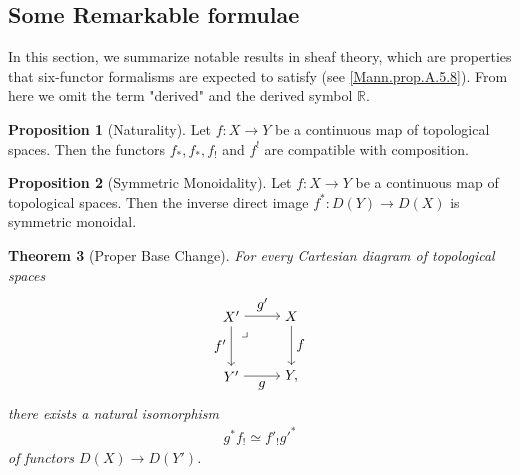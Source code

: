 \documentclass[a4paper,dvipdfmx,11pt,reqno]{amsart}
\newcommand{\bbR}{\mathbb{R}}
\newtheorem{theorem}{Theorem}[section]
\theoremstyle{definition}
\newtheorem{proposition}[theorem]{Proposition}
\begin{document}
\subsection{Some Remarkable formulae} \label{subsec.remarkable_results}

In this section, we summarize notable results in sheaf theory, which are properties that six-functor formalisms are expected to satisfy (see \cref{Mann.prop.A.5.8}).
From here we omit the term "derived" and the derived symbol $\bbR$.

\begin{proposition}[Naturality] \label{thrm.naturality}
  Let $f : X \to Y$ be a continuous map of topological spaces.
  Then the functors $f_{*}, f_{*}, f_{!}$ and $f^{!}$ are compatible with composition.
\end{proposition}

\begin{proposition}[Symmetric Monoidality] \label{thrm.symmetric_monoidality}
  Let $f : X \to Y$ be a continuous map of topological spaces.
  Then the inverse direct image $f^{*} : D(Y) \to D(X)$ is symmetric monoidal.
\end{proposition}

\begin{theorem}[Proper Base Change] \label{thrm.proper_base_change}
  For every Cartesian diagram of topological spaces
  \[\begin{tikzpicture}[auto,->] 
    \node (tl) at (0,1.5) {$X'$}; 
    \node (tr) at (1.5,1.5) {$X$};
    \node (bl) at (0,0) {$Y'$}; 
    \node (br) at (1.5,0) {$Y,$}; 
    \draw (tl) -- node {$g'$} (tr); 
    \draw (bl) -- node[swap] {$g$} (br); 
    \draw (tl) -- node[swap] {$f'$} (bl);
    \draw (tr) -- node {$f$} (br); 
    \node at ([xshift=0.0cm, yshift=-0.2cm] tl.south east) {$\lrcorner$};
  \end{tikzpicture}\]
  there exists a natural isomorphism 
  \begin{align*}
    g^{*}f_{!} \simeq f'_{!}g'^{*}
  \end{align*}
  of functors $D(X) \to D(Y')$.
\end{theorem}
\end{document}
